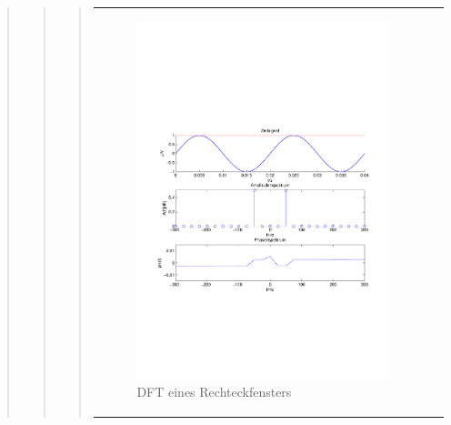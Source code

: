 \begin{quote}
\begin{quote}
\begin{quote}
\begin{center}
\begin{tabular}{ll}
\begin{minipage}{0.6\textwidth}
                        \begin{figure}[H]
                            \label{fig:}
                            \includegraphics[scale=0.5,trim = 1.5cm 7cm 1.5cm 8cm, clip]{./Bilder/Rechteckwindow}
                            \caption{DFT eines Rechteckfensters}
                        \end{figure}
    
                    \end{minipage}
                    \begin{minipage}{0.6\textwidth}
    

\end{minipage}
\end{tabular}
\end{center}
\end{quote}
\end{quote}
\end{quote}
